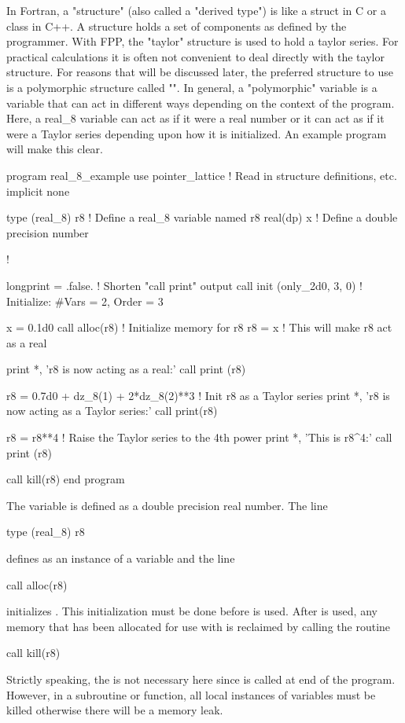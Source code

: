 \documentclass[english,12pt,article]{article} %
\begin{document}
In Fortran, a "structure" (also called a "derived type") is like a struct in C or a class in C++. A structure holds a set of components as defined by the programmer. With FPP, the "taylor" structure is used to hold a taylor series. For practical calculations it is often not convenient to deal directly with the taylor structure. For reasons that will be discussed later, the preferred structure to use is a polymorphic structure called "". In general, a "polymorphic" variable is a variable that can act in different ways depending on the context of the program. Here, a real_8 variable can act as if it were a real number or it can act as if it were a Taylor series depending upon how it is initialized.
An example program will make this clear.
\begin{code}
  program real_8_example
  use pointer_lattice   ! Read in structure definitions, etc.
  implicit none

  type (real_8) r8      ! Define a real_8 variable named r8
  real(dp) x            ! Define a double precision number

  !

  longprint = .false.         ! Shorten "call print" output
  call init (only_2d0, 3, 0)  ! Initialize: #Vars = 2, Order = 3

  x = 0.1d0
  call alloc(r8)          ! Initialize memory for r8
  r8 = x                  ! This will make r8 act as a real

  print *, 'r8 is now acting as a real:'
  call print (r8)

  r8 = 0.7d0 + dz_8(1) + 2*dz_8(2)**3 ! Init r8 as a Taylor series
  print *, 'r8 is now acting as a Taylor series:'
  call print(r8)

  r8 = r8**4  ! Raise the Taylor series to the 4th power
  print *, 'This is r8^4:'
  call print (r8)

  call kill(r8)
  end program
\end{code}

The variable  is defined as a double precision real number. The line
\begin{example}
  type (real_8) r8
\end{example}
defines  as an instance of a  variable and the line
\begin{example}
  call alloc(r8)
\end{example}
initializes . This initialization must be done before  is used. After  is used, any memory that has been allocated for use with  is reclaimed by calling the  routine
\begin{example}
  call kill(r8)
\end{example}
Strictly speaking, the  is not necessary here since  is called at end of the program. However, in a subroutine or function, all local instances of  variables must be killed otherwise there will be a memory leak.
\end{document}
